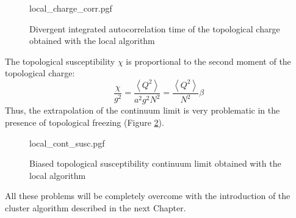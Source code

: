\begin{figure}[!htb]
    \centering
    {local_charge_corr.pgf}
    \caption{Divergent integrated autocorrelation time of the topological charge obtained with the local algorithm}
    \label{fig:local_charge_corr}
\end{figure}

The topological susceptibility $\chi$ is proportional to the second moment of the topological charge:
\[
    \frac{\chi}{g^2} = \frac{\left<Q^2\right>}{a^2g^2N^2} = \frac{\left<Q^2\right>}{N^2}\beta
\]
Thus, the extrapolation of the continuum limit is very problematic in the presence of topological freezing (Figure \ref{fig:local_cont_susc}).

\begin{figure}[!htb]
    \centering
    {local_cont_susc.pgf}
    \caption{Biased topological susceptibility continuum limit obtained with the local algorithm}
    \label{fig:local_cont_susc}
\end{figure}

All these problems will be completely overcome with the introduction of the cluster algorithm described in the next Chapter.


